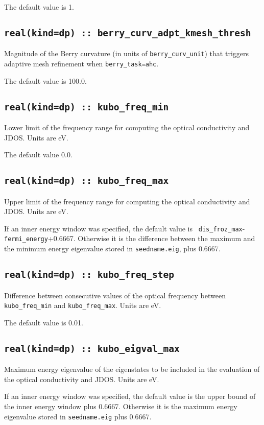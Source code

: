 The default value is 1.


\subsection[berry\_adpt\_kmesh\_thresh]{\tt real(kind=dp) ::
  berry\_curv\_adpt\_kmesh\_thresh}

Magnitude of the Berry curvature (in units of {\tt berry\_curv\_unit})
that triggers adaptive mesh refinement when {\tt berry\_task=ahc}.

The default value is 100.0.


\subsection[optics\_energy\_min]{\tt real(kind=dp) :: kubo\_freq\_min}
Lower limit of the frequency range for computing the optical conductivity
and JDOS. Units are eV.

The default value 0.0.

\subsection[optics\_energy\_max]{\tt real(kind=dp) :: kubo\_freq\_max}
Upper limit of the frequency range for computing the optical conductivity
and JDOS. Units are eV.

If an inner energy window was specified, the default value is {\tt
  dis\_froz\_max}-{\tt fermi\_energy}+0.6667.  Otherwise it is the
difference between the maximum and the minimum energy eigenvalue
stored in {\tt seedname.eig}, plus 0.6667.


\subsection[optics\_energy\_step]{\tt real(kind=dp) :: kubo\_freq\_step}
Difference between consecutive values of the optical frequency
between {\tt kubo\_freq\_min} and {\tt kubo\_freq\_max}. Units are eV.

The default value is 0.01.


\subsection[optics\_energy\_max]{\tt real(kind=dp) ::
  kubo\_eigval\_max}
Maximum energy eigenvalue of the eigenstates to be included in the
evaluation of the optical conductivity and JDOS.  Units are eV.

If an inner energy window was specified, the default value is the
upper bound of the inner energy window plus 0.6667.  Otherwise it is
the maximum energy eigenvalue stored in {\tt seedname.eig} plus
0.6667.

